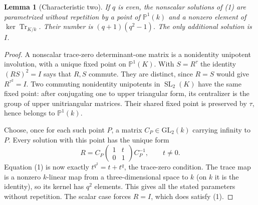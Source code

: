 \documentclass[11pt,a4paper]{article}
\newtheorem{lemma}{Lemma}\newtheorem{proposition}[lemma]{Proposition}
\newcommand{\SL}{\operatorname{SL}}
\begin{document}
\begin{lemma}[Characteristic two]
If $q$ is even, the nonscalar solutions of (1) are parametrized without
repetition by a point of $\mathbb P^1(k)$ and a nonzero element of
$\ker\operatorname{Tr}_{K/k}$. Their number is $(q+1)(q^2-1)$.
The only additional solution is $I$.
\end{lemma}
\begin{proof}
A nonscalar trace-zero determinant-one matrix is a nonidentity unipotent
involution, with a unique fixed point on $\mathbb P^1(K)$.
With $S=R^\tau$ the identity $(RS)^2=I$ says that $R,S$ commute.
They are distinct, since $R=S$ would give $R^{\tau^2}=I$.
Two commuting nonidentity unipotents in $\SL_2(K)$ have the same
fixed point: after conjugating one to upper triangular form, its
centralizer is the group of upper unitriangular matrices. Their shared
fixed point is preserved by $\tau$, hence belongs to $\mathbb P^1(k)$.

Choose, once for each such point $P$, a matrix $C_P\in\mathrm{GL}_2(k)$
carrying infinity to $P$. Every solution with this point has the unique
form
\[
 R=C_P\begin{pmatrix}1&t\\0&1\end{pmatrix}C_P^{-1},
 \qquad t\ne0.
\]
Equation (1) is now exactly $t^{q^2}=t+t^q$, the trace-zero condition.
The trace map is a nonzero $k$-linear map from a three-dimensional
space to $k$ (on $k$ it is the identity), so its kernel has $q^2$
elements. This gives all the stated parameters without repetition.
The scalar case forces $R=I$, which does satisfy (1).
\end{proof}
\end{document}
